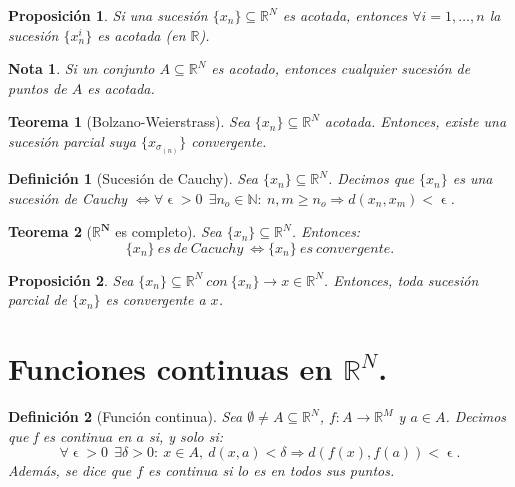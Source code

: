 \documentclass[11pt, a4paper, titlepage]{article}
\let\epsilon\upvarepsilon
\newcommand{\bm}[1]{\boldsymbol{#1}}
\theoremstyle{theorem-style}
\newtheorem*{nth}{Teorema}
\newtheorem*{nprop}{Proposición}
\theoremstyle{definition-style}
\newtheorem*{ndef}{Definición}
\theoremstyle{remark-style}
\newtheorem*{nota}{Nota}
\theoremstyle{example-style}
\begin{document}
\begin{nprop}
Si una sucesión $\{x_n\} \subseteq \mathbb{R}^N$ es acotada, entonces $\forall i=1,\dots,n$ la sucesión $\{x_n^i\}$ es acotada (en $\mathbb{R}$).
\end{nprop}



\begin{nota}
Si un conjunto $A\subseteq \mathbb{R}^N$ es acotado, entonces cualquier sucesión de puntos de $A$ es acotada.
\end{nota}



\begin{nth}[Bolzano-Weierstrass]
Sea $\{x_n\}\subseteq \mathbb{R}^N$ acotada. Entonces, existe una sucesión parcial suya $\{x_{\sigma_{(n)}}\}$ convergente.
\end{nth}



\begin{ndef}[Sucesión de Cauchy]
Sea $\{x_n\}\subseteq \mathbb{R}^N$. Decimos que $\{x_n\}$ es una \textit{sucesión de Cauchy} $\iff \forall \epsilon > 0\ \ \exists n_o \in \mathbb{N}: \ n,m\ge n_o \Rightarrow d(x_n,x_m) < \epsilon$.
\end{ndef}



\begin{nth} [$\bm{\mathbb{R}^N}$ es completo]
Sea $\{x_n\}\subseteq \mathbb{R}^N$. Entonces: $$\{x_n\}\ es\ de\ Cacuchy\ \iff \{x_n\}\ es\ convergente.$$
\end{nth}



\begin{nprop}
Sea $\{x_n\} \subseteq \mathbb{R}^N\ con\ \{x_n\} \rightarrow x \in \mathbb{R}^N$. Entonces, toda sucesión parcial de $\{x_n\}$ es convergente a $x$.
\end{nprop}

\newpage


\section{Funciones continuas en $\mathbb{R}^N$.}



\begin{ndef}[Función continua]
Sea $\emptyset \ne A\subseteq \mathbb{R}^N$, $f: A \longrightarrow \mathbb{R}^M$ y $a \in A$. Decimos que \textit{f es continua en $a$} si, y solo si: $$\forall \epsilon > 0\ \ \exists \delta > 0: \ x\in A, \ d(x,a)<\delta \Rightarrow d(f(x),f(a))<\epsilon.$$
Además, se dice que $f$ es continua si lo es en todos sus puntos.	
\end{ndef}
\end{document}
